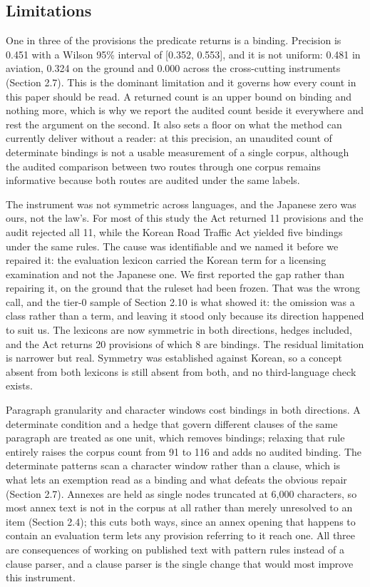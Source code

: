 \subsection{Limitations}\label{sec:4.6}

One in three of the provisions the predicate returns is a binding. Precision is 0.451 with a Wilson 95\% interval of [0.352, 0.553], and it is not uniform: 0.481 in aviation, 0.324 on the ground and 0.000 across the cross-cutting instruments (Section 2.7). This is the dominant limitation and it governs how every count in this paper should be read. A returned count is an upper bound on binding and nothing more, which is why we report the audited count beside it everywhere and rest the argument on the second. It also sets a floor on what the method can currently deliver without a reader: at this precision, an unaudited count of determinate bindings is not a usable measurement of a single corpus, although the audited comparison between two routes through one corpus remains informative because both routes are audited under the same labels.

The instrument was not symmetric across languages, and the Japanese zero was ours, not the law's. For most of this study the Act returned 11 provisions and the audit rejected all 11, while the Korean Road Traffic Act yielded five bindings under the same rules. The cause was identifiable and we named it before we repaired it: the evaluation lexicon carried the Korean term for a licensing examination and not the Japanese one. We first reported the gap rather than repairing it, on the ground that the ruleset had been frozen. That was the wrong call, and the tier-0 sample of Section 2.10 is what showed it: the omission was a class rather than a term, and leaving it stood only because its direction happened to suit us. The lexicons are now symmetric in both directions, hedges included, and the Act returns 20 provisions of which 8 are bindings. The residual limitation is narrower but real. Symmetry was established against Korean, so a concept absent from both lexicons is still absent from both, and no third-language check exists.

Paragraph granularity and character windows cost bindings in both directions. A determinate condition and a hedge that govern different clauses of the same paragraph are treated as one unit, which removes bindings; relaxing that rule entirely raises the corpus count from 91 to 116 and adds no audited binding. The determinate patterns scan a character window rather than a clause, which is what lets an exemption read as a binding and what defeats the obvious repair (Section 2.7). Annexes are held as single nodes truncated at 6,000 characters, so most annex text is not in the corpus at all rather than merely unresolved to an item (Section 2.4); this cuts both ways, since an annex opening that happens to contain an evaluation term lets any provision referring to it reach one. All three are consequences of working on published text with pattern rules instead of a clause parser, and a clause parser is the single change that would most improve this instrument.

